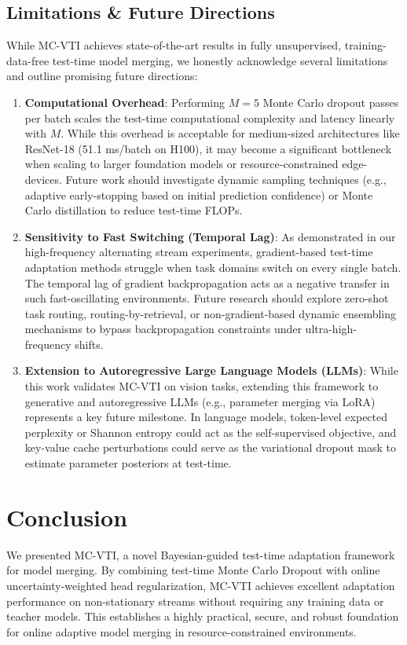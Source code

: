 \documentclass{article}
\theoremstyle{plain}
\theoremstyle{definition}
\theoremstyle{remark}
\begin{document}
\subsection{Limitations \& Future Directions}
\label{subsec:limitations}
While MC-VTI achieves state-of-the-art results in fully unsupervised, training-data-free test-time model merging, we honestly acknowledge several limitations and outline promising future directions:
\begin{enumerate}
  \item \textbf{Computational Overhead}: Performing $M=5$ Monte Carlo dropout passes per batch scales the test-time computational complexity and latency linearly with $M$. While this overhead is acceptable for medium-sized architectures like ResNet-18 (51.1 ms/batch on H100), it may become a significant bottleneck when scaling to larger foundation models or resource-constrained edge-devices. Future work should investigate dynamic sampling techniques (e.g., adaptive early-stopping based on initial prediction confidence) or Monte Carlo distillation to reduce test-time FLOPs.
  \item \textbf{Sensitivity to Fast Switching (Temporal Lag)}: As demonstrated in our high-frequency alternating stream experiments, gradient-based test-time adaptation methods struggle when task domains switch on every single batch. The temporal lag of gradient backpropagation acts as a negative transfer in such fast-oscillating environments. Future research should explore zero-shot task routing, routing-by-retrieval, or non-gradient-based dynamic ensembling mechanisms to bypass backpropagation constraints under ultra-high-frequency shifts.
  \item \textbf{Extension to Autoregressive Large Language Models (LLMs)}: While this work validates MC-VTI on vision tasks, extending this framework to generative and autoregressive LLMs (e.g., parameter merging via LoRA) represents a key future milestone. In language models, token-level expected perplexity or Shannon entropy could act as the self-supervised objective, and key-value cache perturbations could serve as the variational dropout mask to estimate parameter posteriors at test-time.
\end{enumerate}

\section{Conclusion}
\label{sec:conclusion}
We presented MC-VTI, a novel Bayesian-guided test-time adaptation framework for model merging. By combining test-time Monte Carlo Dropout with online uncertainty-weighted head regularization, MC-VTI achieves excellent adaptation performance on non-stationary streams without requiring any training data or teacher models. This establishes a highly practical, secure, and robust foundation for online adaptive model merging in resource-constrained environments.
\end{document}
